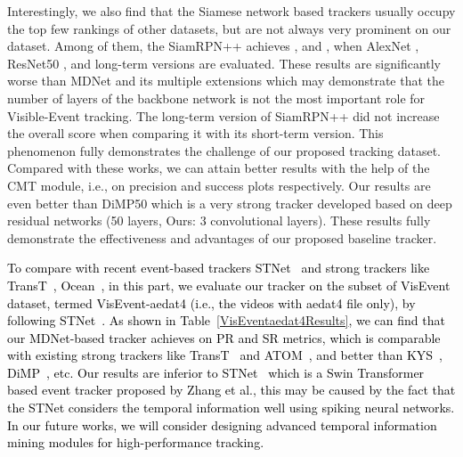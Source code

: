 \documentclass[journal]{IEEEtran}
\begin{document}
Interestingly, we also find that the Siamese network based trackers usually occupy the top few rankings of other datasets, but are not always very prominent on our dataset. Among of them, the SiamRPN++ \cite{li2018siamrpn++} achieves ,  and ,  when AlexNet \cite{krizhevsky2012alexnet}, ResNet50 \cite{he2016deepResNet}, and long-term versions are evaluated. These results are significantly worse than MDNet and its multiple extensions which may demonstrate that the number of layers of the backbone network is not the most important role for Visible-Event tracking. The long-term version of SiamRPN++ did not increase the overall score when comparing it with its short-term version. This phenomenon fully demonstrates the challenge of our proposed tracking dataset. Compared with these works, we can attain better results with the help of the CMT module, i.e.,  on precision and success plots respectively. Our results are even better than DiMP50 \cite{bhat2019DiMP} which is a very strong tracker developed based on deep residual networks (50 layers, Ours: 3 convolutional layers). These results fully demonstrate the effectiveness and advantages of our proposed baseline tracker. 


\textcolor{black}{
To compare with recent event-based trackers STNet~\cite{zhang2022STNet} and strong trackers like TransT~\cite{chen2021TransT}, Ocean~\cite{zhang2020ocean}, in this part, we evaluate our tracker on the subset of VisEvent dataset, termed VisEvent-aedat4 (i.e., the videos with aedat4 file only), by following STNet~\cite{zhang2022STNet}. As shown in Table~\ref{VisEventaedat4Results}, we can find that our MDNet-based tracker achieves  on PR and SR metrics, which is comparable with existing strong trackers like TransT~\cite{chen2021TransT} and ATOM~\cite{danelljan2019atom}, and better than KYS~\cite{Goutam2020KYS}, DiMP~\cite{bhat2019DiMP}, etc. Our results are inferior to STNet~\cite{zhang2022STNet} which is a Swin Transformer based event tracker proposed by Zhang et al., this may be caused by the fact that the STNet considers the temporal information well using spiking neural networks. In our future works, we will consider designing advanced temporal information mining modules for high-performance tracking. 
}
\end{document}
